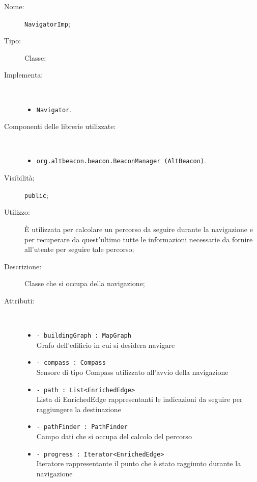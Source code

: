 \documentclass[../DefinizioneDiProdotto.tex]{subfiles}
\begin{document}
\begin{description}
	\item[Nome:] \texttt{NavigatorImp};
	\item[Tipo:] Classe;
	\item[Implementa:] \
	\begin{itemize}
		\item \texttt{Navigator}.
		
	\end{itemize}
	\item[Componenti delle librerie utilizzate:] \
	\begin{itemize}
		\item \texttt{org.altbeacon.beacon.BeaconManager (AltBeacon)}.
		
	\end{itemize}
	\item[Visibilità:] \texttt{public};
	\item[Utilizzo:] È utilizzata per calcolare un percorso da seguire durante la navigazione e per recuperare da quest'ultimo tutte le informazioni necessarie da fornire all'utente per seguire tale percorso;
	\item[Descrizione:] Classe che si occupa della navigazione;
	\item[Attributi:] \
	\begin{itemize}
		\item \texttt{- buildingGraph : MapGraph}\\
		Grafo dell'edificio in cui si desidera navigare
		
		\item \texttt{- compass : Compass}\\
		Sensore di tipo Compass utilizzato all'avvio della navigazione
		
		\item \texttt{- path : List<EnrichedEdge>}\\
		Lista di EnrichedEdge rappresentanti le indicazioni da seguire per raggiungere la destinazione
		
		\item \texttt{- pathFinder : PathFinder}\\
		Campo dati che si occupa del calcolo del percorso
		
		\item \texttt{- progress : Iterator<EnrichedEdge>}\\
		Iteratore rappresentante il punto che è stato raggiunto durante la navigazione
		

\end{itemize}
\end{description}
\end{document}
